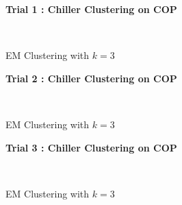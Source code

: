 \begin{figure}[!h]
\centerline{\bfseries\Large Trial 1 : Chiller Clustering on COP}\\
\caption{EM Clustering with $k=3$}
\end{figure}
\begin{figure}[!h]
\centerline{\bfseries\Large Trial 2 : Chiller Clustering on COP}\\
\caption{EM Clustering with $k=3$}
\end{figure}
\begin{figure}[!h]
\centerline{\bfseries\Large Trial 3 : Chiller Clustering on COP}\\
\caption{EM Clustering with $k=3$}
\end{figure}
